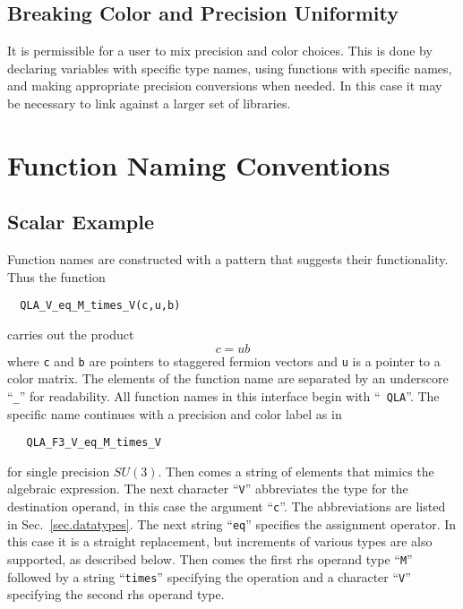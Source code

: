 \documentclass{article}
\begin{document}
\subsection{Breaking Color and Precision Uniformity}

It is permissible for a user to mix precision and color choices.  This
is done by declaring variables with specific type names, using
functions with specific names, and making appropriate precision
conversions when needed.  In this case it may be necessary to link
against a larger set of libraries.

\section{Function Naming Conventions}

\subsection{Scalar Example}

Function names are constructed with a pattern that suggests their
functionality.  Thus the function
%
\begin{verbatim}
  QLA_V_eq_M_times_V(c,u,b)
\end{verbatim}
%
carries out the product
%
\begin{displaymath}
  c = ub
\end{displaymath}
%
where {\tt c} and {\tt b} are pointers to staggered fermion vectors
and {\tt u} is a pointer to a color matrix.  The elements of the
function name are separated by an underscore ``{\tt \_}'' for
readability.  All function names in this interface begin with ``{\tt
QLA}''.  The specific name continues with a precision and color label
as in 
%
\begin{verbatim}
   QLA_F3_V_eq_M_times_V
\end{verbatim}
%
for single precision $SU(3)$.  Then comes a string of elements that
mimics the algebraic expression.  The next character ``{\tt V}''
abbreviates the type for the destination operand, in this case the
argument ``{\tt c}''.  The abbreviations are listed in
Sec.~\ref{sec.datatypes}.  The next string ``{\tt eq}'' specifies the
assignment operator.  In this case it is a straight replacement, but
increments of various types are also supported, as described below.
Then comes the first rhs operand type ``{\tt M}'' followed by a string
``{\tt times}'' specifying the operation and a character ``{\tt V}''
specifying the second rhs operand type.
\end{document}
